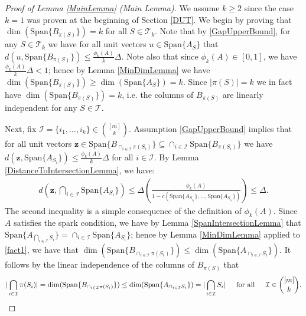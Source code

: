 \documentclass[journal, onecolumn]{IEEEtran}
\begin{document}

\begin{proof}[Proof of Lemma \ref{MainLemma} (Main Lemma)]
We assume $k \geq 2$ since the case $k = 1$ was proven at the beginning of Section \ref{DUT}. We begin by proving that $\dim(\text{Span}\{B_{\pi(S)}\}) = k$ for all $S \in \mathcal{T}_k$. Note that by \eqref{GapUpperBound}, for any $S \in \mathcal{T}_k$ we have for all unit vectors $u \in \text{Span}\{A_S\}$ that $d(u, \text{Span}\{B_{\pi(S)}\}) \leq \frac{\phi_k(A)}{k} \Delta$. Note also that since $\phi_k(A) \in [0,1]$, we have $\frac{\phi_k(A)}{k} \Delta < 1$; hence by Lemma \ref{MinDimLemma} we have $\dim(\text{Span}\{B_{\pi(S)}\}) \geq \dim(\text{Span}\{A_S\}) = k$. Since $|\pi(S)| = k$ we in fact have $\dim(\text{Span}\{B_{\pi(S)}\}) = k$, i.e. the columns of $B_{\pi(S)}$ are linearly independent for any $S \in \mathcal{T}$. 

Next, fix $\mathcal{I} = \{i_1, \ldots, i_k\} \in {[m] \choose k}$. Assumption \eqref{GapUpperBound} implies that for all unit vectors $\mathbf{z} \in  \text{Span}\{B_{\cap_{i \in \mathcal{I}}\pi(S_i)}\} \subseteq \cap_{i \in \mathcal{I}} \text{Span}\{B_{\pi(S_i)}\}$ we have $d(\mathbf{z}, \text{Span}\{A_{S_i}\}) \leq \frac{\phi_k(A)}{k} \Delta$ for all $i \in \mathcal{I}$. By Lemma \ref{DistanceToIntersectionLemma}, we have:
\begin{align}\label{fact1}
d\left( \mathbf{z}, \bigcap_{i \in \mathcal{I}} \text{Span}\{A_{S_i}\} \right) \leq \Delta \left( \frac{\phi_k(A)}{1 - c(\text{Span}\{A_{S_{i_1}}\}, \ldots, \text{Span}\{A_{S_{i_\ell}}\})} \right) \leq \Delta.
\end{align}
%
The second inequality is a simple consequence of the definition of $\phi_k(A)$. Since $A$ satisfies the spark condition, we have by Lemma \ref{SpanIntersectionLemma} that $\text{Span}\{A_{\bigcap_{i \in \mathcal{I}} S_{i}}\} = \cap_{i \in \mathcal{I}} \text{Span}\{A_{S_i}\}$; hence by Lemma \ref{MinDimLemma} applied to \eqref{fact1}, we have that $\dim(\text{Span}\{B_{\cap_{i \in \mathcal{I}}\pi(S_{i})}\}) \leq \dim(\text{Span}\{A_{\cap_{i \in \mathcal{I}} S_{i}}\})$. It follows by the linear independence of the columns of $B_{\pi(S)}$ that
\begin{align}\label{fact2}
|\bigcap_{i \in \mathcal{I}} \pi(S_{i})| 
= \dim(\text{Span}\{B_{\cap_{i \in \mathcal{I}}\pi(S_{i})}\})
\leq \dim(\text{Span}\{A_{\cap_{i \in \mathcal{I}} S_{i}}\})
= |\bigcap_{i \in \mathcal{I}} S_{i} | \indent \text{for all} \indent \mathcal{I} \in {[m] \choose k}.
\end{align}


\end{proof}
\end{document}
